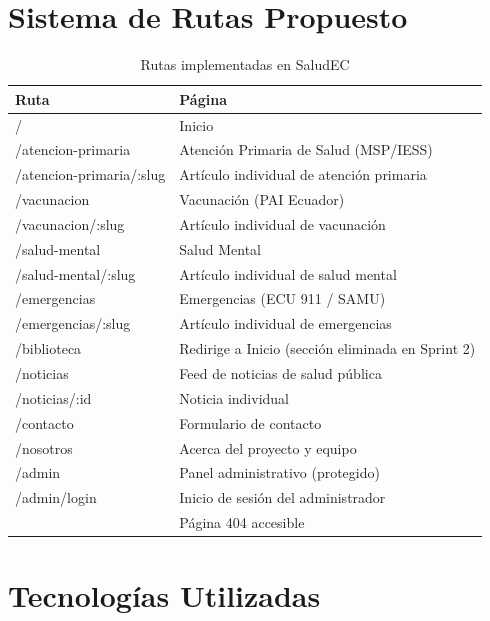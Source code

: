 \documentclass[12pt, a4paper]{article}
\begin{document}
\section{Sistema de Rutas Propuesto}

\begin{table}[H]
\centering
\caption{Rutas implementadas en SaludEC}
\small
\begin{tabular}{@{}>{\ttfamily\small}p{5.5cm} p{8cm}@{}}
\toprule
\rowcolor{royalblue!12}
\textbf{Ruta} & \textbf{Página} \\
\midrule
/                       & Inicio \\
/atencion-primaria      & Atención Primaria de Salud (MSP/IESS) \\
/atencion-primaria/:slug & Artículo individual de atención primaria \\
/vacunacion             & Vacunación (PAI Ecuador) \\
/vacunacion/:slug        & Artículo individual de vacunación \\
/salud-mental           & Salud Mental \\
/salud-mental/:slug      & Artículo individual de salud mental \\
/emergencias            & Emergencias (ECU 911 / SAMU) \\
/emergencias/:slug       & Artículo individual de emergencias \\
/biblioteca             & Redirige a Inicio (sección eliminada en Sprint 2) \\
/noticias               & Feed de noticias de salud pública \\
/noticias/:id            & Noticia individual \\
/contacto               & Formulario de contacto \\
/nosotros               & Acerca del proyecto y equipo \\
/admin                  & Panel administrativo (protegido) \\
/admin/login            & Inicio de sesión del administrador \\
*                       & Página 404 accesible \\
\bottomrule
\end{tabular}
\end{table}

\section{Tecnologías Utilizadas}
\end{document}
